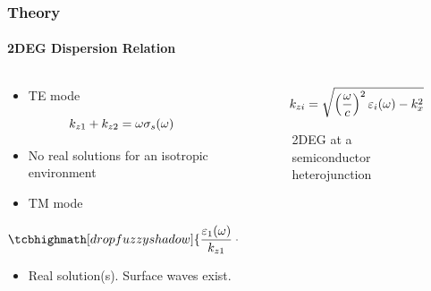 \documentclass[mathserif,18pt,xcolor=table]{beamer}
\begin{document}
\begin{frame}

  \frametitle{Theory}
  \framesubtitle{2DEG Dispersion Relation}
  \vspace*{-.5cm}
  \begin{columns} %
    \begin{column}[T]{.5\textwidth}
      \begin{itemize}
        \item TE mode
      \end{itemize}
      \begin{equation} \nonumber
        k_{z1} + k_{z2} = \omega \sigma_s(\omega)
        \label{eq:disp_TE_two}
      \end{equation}
      \begin{itemize}
        \item[] No real solutions for an isotropic environment
      \end{itemize}
      \begin{itemize}
        \item TM mode
      \end{itemize}
      \begin{equation} \nonumber
        \tcbhighmath[drop fuzzy shadow]{\frac{\E_1(\O)}{k_{z1}} + \frac{\E_2(\O)}{k_{z2}} = -\frac{\sigma_s(\O)}{\O}}
        \label{eq:disp_TM_two}
      \end{equation}
      \begin{itemize}
        \item[] Real solution(s). Surface waves exist.
      \end{itemize}
    \end{column}
    \begin{column}[T]{.5\textwidth}
      \begin{equation} \nonumber
        \begin{split}
          k_{zi} = \sqrt{\left(\frac{\omega}{c}\right)^2 \varepsilon_i(\omega) -  k_x^2}
        \end{split}
        \label{eq:kz}
      \end{equation}
      \begin{figure}
        \def\svgwidth{\linewidth}
        
        \caption{2DEG at a semiconductor heterojunction}
      \end{figure}
      \end{column}%
    \end{columns}
  \end{frame}
\end{document}
